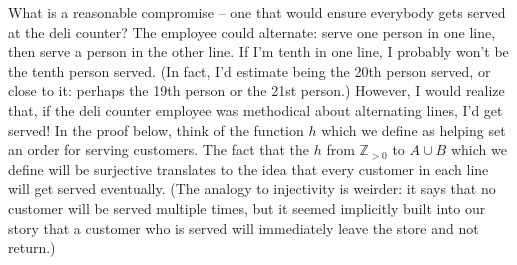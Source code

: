 \documentclass{book}
\theoremstyle{ekimcustom}
\begin{document}
What is a reasonable compromise -- one that would ensure everybody gets served at the deli counter? The employee could alternate: serve one person in one line, then serve a person in the other line. If I'm tenth in one line, I probably won't be the tenth person served. (In fact, I'd estimate being the 20th person served, or close to it: perhaps the 19th person or the 21st person.) However, I would realize that, if the deli counter employee was methodical about alternating lines, I'd get served! In the proof below, think of the function $h$ which we define as helping set an order for serving customers. The fact that the $h$ from $\mathbb{Z}_{>0}$ to $A \cup B$ which we define will be surjective translates to the idea that every customer in each line will get served eventually. (The analogy to injectivity is weirder: it says that no customer will be served multiple times, but it seemed implicitly built into our story that a customer who is served will immediately leave the store and not return.)
\end{document}
